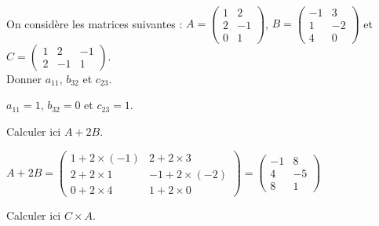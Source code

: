 \documentclass[a4paper,10pt]{article}
\begin{document}


\\

On considère les matrices suivantes : 
$A = \begin{pmatrix}
1&2\\
2 & -1\\
0 & 1
\end{pmatrix}$,
$B = \begin{pmatrix}
-1&3\\
1 & -2\\
4 & 0
\end{pmatrix}$ et 
$C = \begin{pmatrix}
1&2 & -1\\
2 & -1 & 1
\end{pmatrix}$.\\

Donner $a_{11}$, $b_{32}$ et $c_{23}$.\\

\begin{encadre}[Réponse]
$a_{11}=1$, $b_{32}=0$ et $c_{23}=1$.
\end{encadre}

Calculer ici $A + 2B$.

\begin{encadre}[Réponse]
$A+2B=\begin{pmatrix}
1+2\times (-1)&2+2\times 3\\
2+2\times 1 & -1 + 2\times(-2)\\
0 + 2\times 4 & 1 + 2\times 0
\end{pmatrix}
=
\begin{pmatrix}
-1&8\\
4 & -5\\
8 & 1
\end{pmatrix}$
\end{encadre}

Calculer ici $C\times A$.\\
\end{document}
